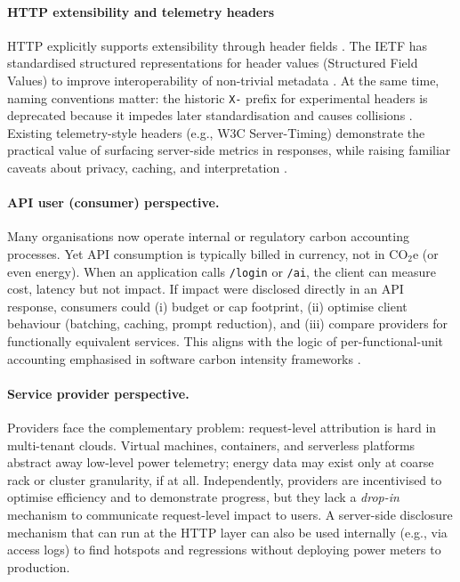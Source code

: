 \paragraph{HTTP extensibility and telemetry headers}
HTTP explicitly supports extensibility through header fields \cite{rfc9110}. The IETF has standardised structured representations for header values (Structured Field Values) to improve interoperability of non-trivial metadata \cite{rfc8941}. At the same time, naming conventions matter: the historic \texttt{X-} prefix for experimental headers is deprecated because it impedes later standardisation and causes collisions \cite{rfc6648}. Existing telemetry-style headers (e.g., W3C Server-Timing) demonstrate the practical value of surfacing server-side metrics in responses, while raising familiar caveats about privacy, caching, and interpretation \cite{w3c-servertiming}.

\paragraph{API user (consumer) perspective.} Many organisations now operate internal or regulatory carbon accounting processes. Yet API consumption is typically billed in currency, not in \(\mathrm{CO_2e}\) (or even energy). When an application calls \texttt{/login} or \texttt{/ai}, the client can measure cost, latency but not impact. If impact were disclosed directly in an API response, consumers could (i) budget or cap footprint, (ii) optimise client behaviour (batching, caching, prompt reduction), and (iii) compare providers for functionally equivalent services. This aligns with the logic of per-functional-unit accounting emphasised in software carbon intensity frameworks \cite{gsf-sci}.

\paragraph{Service provider perspective.} Providers face the complementary problem: request-level attribution is hard in multi-tenant clouds. Virtual machines, containers, and serverless platforms abstract away low-level power telemetry; energy data may exist only at coarse rack or cluster granularity, if at all. Independently, providers are incentivised to optimise efficiency and to demonstrate progress, but they lack a \emph{drop-in} mechanism to communicate request-level impact to users. A server-side disclosure mechanism that can run at the HTTP layer can also be used internally (e.g., via access logs) to find hotspots and regressions without deploying power meters to production.


